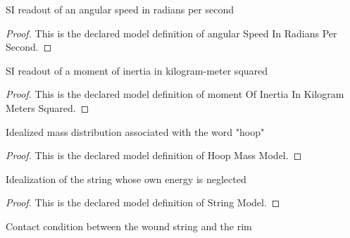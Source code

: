 \begin{definition}
  \label{def:physics:phyx-mini-0779:phyxminiproblems-problemphyxmini0779-angularspeedinradianspersecond}
  SI readout of an angular speed in radians per second
\end{definition}
\begin{proof}
  This is the declared model definition of angular Speed In Radians Per Second.
\end{proof}
\begin{definition}
  \label{def:physics:phyx-mini-0779:phyxminiproblems-problemphyxmini0779-momentofinertiainkilogrammeterssquared}
  SI readout of a moment of inertia in kilogram-meter squared
\end{definition}
\begin{proof}
  This is the declared model definition of moment Of Inertia In Kilogram Meters Squared.
\end{proof}
\begin{definition}
  \label{def:physics:phyx-mini-0779:phyxminiproblems-problemphyxmini0779-hoopmassmodel}
  Idealized mass distribution associated with the word "hoop"
\end{definition}
\begin{proof}
  This is the declared model definition of Hoop Mass Model.
\end{proof}
\begin{definition}
  \label{def:physics:phyx-mini-0779:phyxminiproblems-problemphyxmini0779-stringmodel}
  Idealization of the string whose own energy is neglected
\end{definition}
\begin{proof}
  This is the declared model definition of String Model.
\end{proof}
\begin{definition}
  \label{def:physics:phyx-mini-0779:phyxminiproblems-problemphyxmini0779-stringhoopcontact}
  Contact condition between the wound string and the rim
\end{definition}
